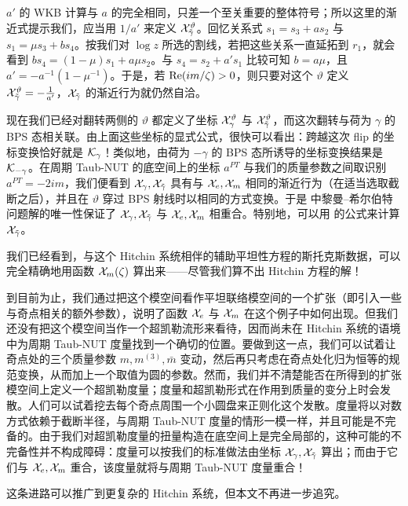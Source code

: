 $a'$ 的 WKB 计算与 $a$ 的完全相同，只差一个至关重要的整体符号；所以这里的渐近式提示我们，应当用 $1/a'$ 来定义 $\mathcal{X}^\vartheta_{\tilde \gamma}$。回忆关系式 $s_1 = s_3 + a s_2$ 与 $s_1 = \mu s_3 + b s_4$。按我们对 $\log z$ 所选的割线，若把这些关系一直延拓到 $r_1$，就会看到 $b s_4 = (1-\mu) s_1 + a \mu s_2$。与 $s_4 = s_2 + a' s_1$ 比较可知 $b = a \mu$，且 $a' = - a^{-1} (1-\mu^{-1})$。于是，若 ${\rm Re}(im/\zeta)>0$，则只要对这个 $\vartheta$ 定义 $\mathcal{X}^\vartheta_{\tilde \gamma} = -\frac{1}{a'}$，$\mathcal{X}_{\tilde \gamma}$ 的渐近行为就仍然自洽。

现在我们已经对翻转两侧的 $\vartheta$ 都定义了坐标 $\mathcal{X}^\vartheta_\gamma$ 与 $\mathcal{X}^\vartheta_{\tilde\gamma}$，而这次翻转与荷为 $\gamma$ 的 BPS 态相关联。由上面这些坐标的显式公式，很快可以看出：跨越这次 flip 的坐标变换恰好就是 $\mathcal{K}_\gamma$！类似地，由荷为 $-\gamma$ 的 BPS 态所诱导的坐标变换结果是 $\mathcal{K}_{-\gamma}$。在周期 Taub-NUT 的底空间上的坐标 $a^{PT}$ 与我们的质量参数之间取识别 $a^{PT} = -2 i m$，我们便看到 $\mathcal{X}_\gamma, \mathcal{X}_{\tilde \gamma}$ 具有与 $\mathcal{X}_e, \mathcal{X}_m$ 相同的渐近行为（在适当选取截断之后），并且在 $\vartheta$ 穿过 BPS 射线时以相同的方式变换。于是 \cite{Gaiotto:2008cd} 中黎曼–希尔伯特问题解的唯一性保证了 $\mathcal{X}_\gamma, \mathcal{X}_{\tilde \gamma}$ 与 $\mathcal{X}_e, \mathcal{X}_m$ 相重合。特别地，可以用 \cite{Gaiotto:2008cd} 的公式来计算 $\mathcal{X}_{\tilde \gamma}$。

我们已经看到，与这个 Hitchin 系统相伴的辅助平坦性方程的斯托克斯数据，可以完全精确地用函数 $\mathcal{X}_m(\zeta)$ 算出来——尽管我们算不出 Hitchin 方程的解！

到目前为止，我们通过把这个模空间看作平坦联络模空间的一个扩张（即引入一些与奇点相关的额外参数），说明了函数 $\mathcal{X}_e$ 与 $\mathcal{X}_m$ 在这个例子中如何出现。但我们还没有把这个模空间当作一个超凯勒流形来看待，因而尚未在 Hitchin 系统的语境中为周期 Taub-NUT 度量找到一个确切的位置。要做到这一点，我们可以试着让奇点处的三个质量参数 $m, m^{(3)}, \bar{m}$ 变动，然后再只考虑在奇点处化归为恒等的规范变换，从而加上一个取值为圆的参数。然而，我们并不清楚能否在所得到的扩张模空间上定义一个超凯勒度量；度量和超凯勒形式在作用到质量的变分上时会发散。人们可以试着挖去每个奇点周围一个小圆盘来正则化这个发散。度量将以对数方式依赖于截断半径，与周期 Taub-NUT 度量的情形一模一样，并且可能是不完备的。由于我们对超凯勒度量的扭量构造在底空间上是完全局部的，这种可能的不完备性并不构成障碍：度量可以按我们的标准做法由坐标 $\mathcal{X}_\gamma, \mathcal{X}_{\tilde \gamma}$ 算出；而由于它们与 $\mathcal{X}_e, \mathcal{X}_m$ 重合，该度量就将与周期 Taub-NUT 度量重合！

这条进路可以推广到更复杂的 Hitchin 系统，但本文不再进一步追究。


